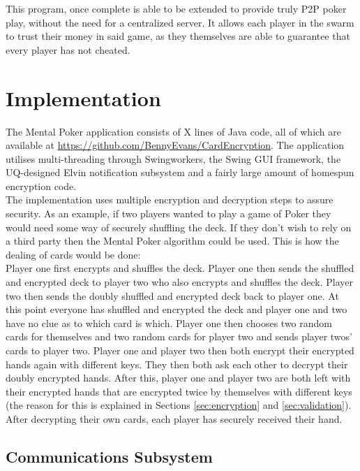 \documentclass[11pt, oneside]{article}   	%
\begin{document}
This program, once complete is able to be extended to provide truly P2P poker play, without the need for a centralized server. It allows each player in the swarm to trust their money in said game, as they themselves are able to guarantee that every player has not cheated.

\section{Implementation}

The Mental Poker application consists of X lines of Java code, all of which are available at \url{https://github.com/BennyEvans/CardEncryption}. The application utilises multi-threading through Swingworkers, the Swing GUI framework, the UQ-designed Elvin notification subsystem and a fairly large amount of homespun encryption code.\\

The implementation uses multiple encryption and decryption steps to assure security. As an example, if two players wanted to play a game of Poker they would need some way of securely shuffling the deck. If they don’t wish to rely on a third party then the Mental Poker algorithm could be used. This is how the dealing of cards would be done:\\

Player one first encrypts and shuffles the deck. Player one then sends the shuffled and encrypted deck to player two who also encrypts and shuffles the deck. Player two then sends the doubly shuffled and encrypted deck back to player one. At this point everyone has shuffled and encrypted the deck and player one and two have no clue as to which card is which. Player one then chooses two random cards for themselves and two random cards for player two and sends player twos’ cards  to player two. Player one and player two then both encrypt their encrypted hands again with different keys. They then both ask each other to decrypt their doubly encrypted hands. After this, player one and player two are both left with their encrypted hands that are encrypted twice by themselves with different keys (the reason for this is explained in Sections \ref{sec:encryption} and \ref{sec:validation}). After decrypting their own cards, each player has securely received their hand.

\subsection{Communications Subsystem}
\label{sec:comsubsys}				
\end{document}
